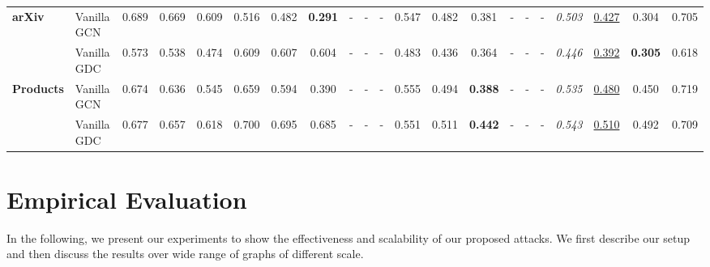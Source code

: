 \documentclass[letterpaper]{article} %
\begin{document}
\begin{table*}
{\begin{tabular}{llccccccccccccccccccc}
    \cline{1-21}
    \multirow{2}{*}{\textbf{arXiv}} & Vanilla GCN &         0.689 &  0.669 &  0.609 &                0.516 &              0.482 &  \textbf{0.291} &                    - &                  - &               - &                  0.547 &              0.482 &           0.381 &               - &                  - &               - &         \textit{0.503} &  \underline{0.427} &           0.304 &             0.705 \\
                      & Vanilla GDC &         0.573 &  0.538 &  0.474 &                0.609 &              0.607 &           0.604 &                    - &                  - &               - &                  0.483 &              0.436 &           0.364 &               - &                  - &               - &         \textit{0.446} &  \underline{0.392} &  \textbf{0.305} &             0.618 \\
    \cline{1-21}
    \multirow{2}{*}{\textbf{Products}} & Vanilla GCN &         0.674 &  0.636 &  0.545 &                0.659 &              0.594 &           0.390 &                    - &                  - &               - &                  0.555 &              0.494 &  \textbf{0.388} &               - &                  - &               - &         \textit{0.535} &  \underline{0.480} &           0.450 &             0.719 \\
                      & Vanilla GDC &         0.677 &  0.657 &  0.618 &                0.700 &              0.695 &           0.685 &                    - &                  - &               - &                  0.551 &              0.511 &  \textbf{0.442} &               - &                  - &               - &         \textit{0.543} &  \underline{0.510} &           0.492 &             0.709 \\
    \bottomrule
    \end{tabular}
}
\end{table*}

\section{Empirical Evaluation}\label{sec:empirical}

In the following, we present our experiments to show the effectiveness and scalability of our proposed attacks. We first describe our setup and then discuss the results over wide range of graphs of different scale. %
\end{document}

